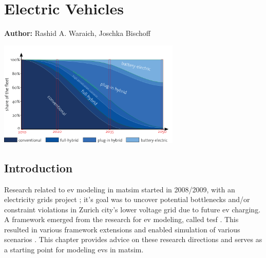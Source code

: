 \chapter{Electric Vehicles}
\label{ch:elvehicles}

\hfill \textbf{Author:} Rashid A. Waraich, Joschka Bischoff

\begin{center} \includegraphics[width=0.65\textwidth, angle=0]{extending/figures/Elvehicles/main.png} \end{center}



\section{Introduction}
Research related to \gls{ev} modeling in \gls{matsim} started in 2008/2009, with an electricity grids project \citep[][]{WaraichEtAl_IATBR_2009, WaraichEtAl_TRR_2013}; it's goal was to uncover potential bottlenecks and/or constraint violations in Zurich city's lower voltage grid due to future \gls{ev} charging. A framework emerged from the research for \gls{ev} modeling, called \gls{tesf} \citep[][]{WaraichEtAl_JanssensEtAl_2014}. This resulted in various framework extensions and enabled simulation of various scenarios \citep[][]{WaraichEtAl_JanssensEtAl_2014, Waraich_PhDThesis_2014, AbedinWaraich_JSDEWES_2014, Schieffer_MastersThesis_2011, GalusAndersson_CIGRE_2011, GalusEtAl_ResRep_EWZ_2012, Bischoff2013MaTaxis, BischoffMaciejewskiEcabMielecMobilTUM}. This chapter provides advice on these research directions and serves as a starting point for modeling \glspl{ev} in \gls{matsim}.

